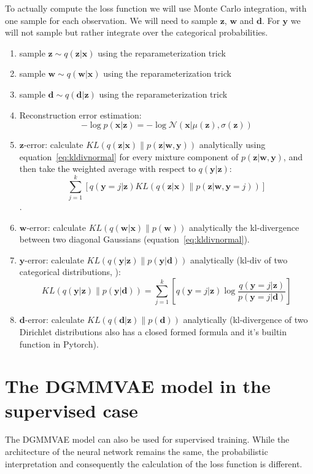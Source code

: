 \documentclass[11pt, a4paper]{report}
\theoremstyle{plain}
\theoremstyle{definition}
\theoremstyle{remark}
\newcommand{\x}{\mathbf{x}}
\newcommand{\z}{\mathbf{z}}
\newcommand{\y}{\mathbf{y}}
\newcommand{\w}{\mathbf{w}}
\newcommand{\dd}{\mathbf{d}}
\newcommand{\NN}{\mathcal{N}}
\begin{document}
To actually compute the loss function we will use Monte Carlo integration,
with one sample for each observation.
We will need to sample $\z$, $\w$ and $\dd$. For $\y$ we will not sample but
rather integrate over the categorical probabilities.


\begin{enumerate}
\item{sample} $\z \sim q(\z | \x)$ using the reparameterization trick
\item{sample} $\w \sim q(\w | \x)$ using the reparameterization trick
\item{sample} $\dd \sim q(\dd | \z)$ using the reparameterization trick
\item{Reconstruction error estimation}:
$$-\log p(\x | \z) = -\log \NN(\x | \mu(\z), \sigma(\z))$$
\item{$\z$-error}: calculate $KL(q(\z | \x) \| p(\z | \w, \y))$ analytically
using equation~\ref{eq:kldivnormal}
for every mixture component of $p(\z | \w, \y)$,
and then take the weighted average with respect
to $q(\y | \z)$:
$$\sum_{j=1}^k [ q(\y=j | \z) KL(q(\z | \x) \| p(\z | \w, \y=j))]$$.
\item{$\w$-error}: calculate $KL(q(\w | \x) \| p(\w))$ analytically 
the kl-divergence between two diagonal Gaussians (equation~\ref{eq:kldivnormal}).
\item{$\y$-error}:
calculate $KL(q(\y | \z) \| p(\y | \dd))$ analytically (kl-div of
two categorical distributions, ):
$$KL(q(\y | \z) \| p(\y | \dd)) = 
\sum_{j=1}^k [ q(\y=j | \z) \log \frac{q(\y=j | \z)}{p(\y = j | \dd)}]$$
\item{$\dd$-error}:
calculate $KL(q(\dd | \z) \| p(\dd))$ analytically
(kl-divergence of two Dirichlet distributions also has a closed formed
formula and it's builtin function in Pytorch).
\end{enumerate}

\section{The DGMMVAE model in the supervised case}

The DGMMVAE model can also be used for supervised training. While the
architecture of the neural network remains the same, the probabilistic
interpretation and consequently the calculation of the loss function is
different.
\end{document}
